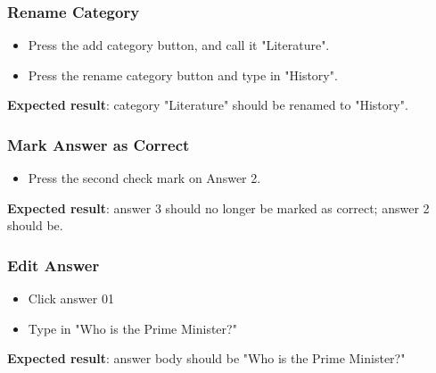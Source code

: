 \subsubsection{Rename Category}
\begin{itemize}
\item Press the add category button, and call it "Literature".
\item Press the rename category button and type in "History".
\end{itemize}
\textbf{Expected result}: category "Literature" should be renamed to "History".

\subsubsection{Mark Answer as Correct}
\begin{itemize}
\item Press the second check mark on Answer 2.
\end{itemize}
\textbf{Expected result}: answer 3 should no longer be marked as correct; answer 2 should be.

\subsubsection{Edit Answer}
\begin{itemize}
\item Click answer 01
\item Type in "Who is the Prime Minister?"
\end{itemize}
\textbf{Expected result}: answer body should be "Who is the Prime Minister?"
